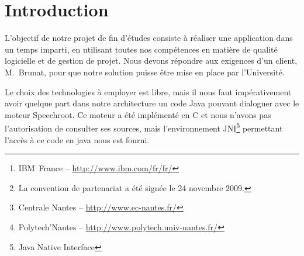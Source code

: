 \documentclass[a4paper,11pt]{report}
\begin{document}


\begin{abstract}
Le projet de fin d'études consiste à mettre en \oe{}uvre les compétences acquises au cours des deux années de Master.
Chaque groupe de quatre à six étudiants travaille sur un sujet de projet différent.
Le déroulement du projet doit respecter les étapes de création d'un véritable projet et doit en conséquent tirer au maximum profit des différents outils de gestion de projet.

Le projet que nous avons choisi de réaliser a été proposé par l'entreprise IBM~France\footnote{IBM~France -- \url{http://www.ibm.com/fr/fr/}}.
Il s'agit du fruit d'un partenariat entre IBM et l'Université de Nantes\footnote{La convention de partenariat a été signée le 24 novembre 2009.} afin de faciliter la scolarisation des étudiants malentendants.
En effet, à l'aide d'un logiciel disposant d'un moteur de reconnaissance vocale (en l'occurrence le moteur ``Speechroot'' d'IBM), l'étudiant aurait accès au sous-titrage du discours de l'enseignant de manière immédiate.
Ce projet diffère légèrement des autres par le fait que nous devons travailler en collaboration avec des groupes d'étudiants de d'autres écoles.
L'équipe d'IBM, composée de Béatrice~Martin et de sa collègue Christel~Amato, technicienne ayant une très importante expérience dans le domaine de la reconnaissance vocale, se charge de la coordination entre les trois groupes d'étudiants (celui de Centrale\footnote{Centrale Nantes -- \url{http://www.ec-nantes.fr/}}, de Polytech'\footnote{Polytech'Nantes -- \url{http://www.polytech.univ-nantes.fr/}} et nous-mêmes) et Stéphane~Brunat du Relai Handicap.
\end{abstract}

\tableofcontents


\chapter*{Introduction}
L'objectif de notre projet de fin d'études consiste à réaliser une application dans un temps imparti, en utilisant toutes nos compétences en matière de qualité logicielle et de gestion de projet.
Nous devons répondre aux exigences d'un client, M.~Brunat, pour que notre solution puisse être mise en place par l'Université.

Le choix des technologies à employer est libre, mais il nous faut im\-pé\-ra\-ti\-ve\-ment avoir quelque part dans notre architecture un code Java pouvant dialoguer avec le moteur Speechroot.
Ce moteur a été implémenté en C et nous n'avons pas l'autorisation de consulter ses sources, mais l'environnement JNI\footnote{Java Native Interface} permettant l'accès à ce code en java nous est fourni.
\end{document}
